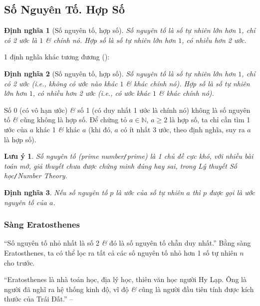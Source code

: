 \documentclass{article}
\numberwithin{equation}{section}
\newtheorem{dinhnghia}{Định nghĩa}[section]
\newtheorem{luuy}{Lưu ý}[section]
\begin{document}

\subsection{Số Nguyên Tố. Hợp Số}

\begin{dinhnghia}[Số nguyên tố, hợp số]
	\emph{Số nguyên tố} là số tự nhiên lớn hơn $1$, chỉ có 2 ước là $1$ \textit{\&} chính nó. \emph{Hợp số} là số tự nhiên lớn hơn $1$, có nhiều hơn 2 ước.
\end{dinhnghia}
1 định nghĩa khác tương đương (\cite[\S5, p. 23]{Binh_Toan_6_tap_1}):

\begin{dinhnghia}[Số nguyên tố, hợp số]
	\emph{Số nguyên tố} là số tự nhiên lớn hơn $1$, chỉ có 2 ước (i.e., không có ước nào khác $1$ \& khác chính nó). \emph{Hợp số} là số tự nhiên lớn hơn $1$, có nhiều hơn 2 ước (i.e., có ước khác $1$ \& khác chính nó).
\end{dinhnghia}
Số 0 (có vô hạn ước) \textit{\&} số 1 (có duy nhất 1 ước là chính nó) không là số nguyên tố \textit{\&} cũng không là hợp số. Để chứng tỏ $a\in\mathbb{N}$, $a\ge 2$ là hợp số, ta chỉ cần tìm 1 ước của $a$ khác 1 \textit{\&} khác $a$ (khi đó, $a$ có ít nhất 3 ước, theo định nghĩa, suy ra $a$ là hợp số).

\begin{luuy}
	Số nguyên tố (prime number\emph{\texttt{/}}prime) là 1 chủ đề cực khó, với nhiều bài toán mở, giả thuyết chưa được chứng minh đúng hay sai, trong Lý thuyết Số học\emph{\texttt{/}}Number Theory.
\end{luuy}

\begin{dinhnghia}
	Nếu số nguyên tố $p$ là ước của số tự nhiên $a$ thì $p$ được gọi là \emph{ước nguyên tố} của $a$.
\end{dinhnghia}

\subsubsection{Sàng Eratosthenes}
``Số nguyên tố nhỏ nhất là số 2 \textit{\&} đó là số nguyên tố chẵn duy nhất.'' Bằng sàng Eratosthenes, ta có thể lọc ra tất cả các số nguyên tố nhỏ hơn 1 số tự nhiên $n$ cho trước.

``Eratosthenes là nhà toán học, địa lý học, thiên văn học người Hy Lạp. Ông là người đã nghĩ ra hệ thống kinh độ, vĩ độ \textit{\&} cũng là người đầu tiên tính được kích thước của Trái Đất.'' -- \cite[p. 43]{SGK_Toan_6_Canh_Dieu_tap_1}
\end{document}
